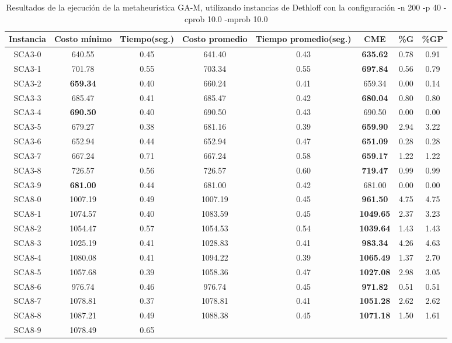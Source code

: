 \begin{table}[ht]
\caption{Resultados de la ejecución de la metaheurística GA-M, utilizando instancias de Dethloff con la configuración -n 200 -p 40 -cprob 10.0 -mprob 10.0}
\centering
\small
\begin{tabular}{c c c c c c c c}
\hline\hline
Instancia & Costo mínimo & Tiempo(seg.) & Costo promedio & Tiempo promedio(seg.) & CME & \%G & \%GP \\ [0.5ex]
\hline
SCA3-0 & 640.55 & 0.45 & 
641.40 & 0.43 & \bf{635.62} & 
0.78 & 0.91\\SCA3-1 & 701.78 & 0.55 & 
703.34 & 0.55 & \bf{697.84} & 
0.56 & 0.79\\SCA3-2 & \bf{659.34} & 0.40 & 
660.24 & 0.41 & 659.34 & 0.00
 & 0.14\\SCA3-3 & 685.47 & 0.41 & 
685.47 & 0.42 & \bf{680.04} & 
0.80 & 0.80\\SCA3-4 & \bf{690.50} & 0.40 & 
690.50 & 0.43 & 690.50 & 0.00
 & 0.00\\
SCA3-5 & 679.27 & 0.38 & 
681.16 & 0.39 & \bf{659.90} & 
2.94 & 3.22\\SCA3-6 & 652.94 & 0.44 & 
652.94 & 0.47 & \bf{651.09} & 
0.28 & 0.28\\SCA3-7 & 667.24 & 0.71 & 
667.24 & 0.58 & \bf{659.17} & 
1.22 & 1.22\\SCA3-8 & 726.57 & 0.56 & 
726.57 & 0.60 & \bf{719.47} & 
0.99 & 0.99\\SCA3-9 & \bf{681.00} & 0.44 & 
681.00 & 0.42 & 681.00 & 0.00
 & 0.00\\
SCA8-0 & 1007.19 & 0.49 & 
1007.19 & 0.45 & \bf{961.50} & 
4.75 & 4.75\\SCA8-1 & 1074.57 & 0.40 & 
1083.59 & 0.45 & \bf{1049.65} & 
2.37 & 3.23\\SCA8-2 & 1054.47 & 0.57 & 
1054.53 & 0.54 & \bf{1039.64} & 
1.43 & 1.43\\SCA8-3 & 1025.19 & 0.41 & 
1028.83 & 0.41 & \bf{983.34} & 
4.26 & 4.63\\SCA8-4 & 1080.08 & 0.41 & 
1094.22 & 0.39 & \bf{1065.49} & 
1.37 & 2.70\\SCA8-5 & 1057.68 & 0.39 & 
1058.36 & 0.47 & \bf{1027.08} & 
2.98 & 3.05\\SCA8-6 & 976.74 & 0.46 & 
976.74 & 0.45 & \bf{971.82} & 
0.51 & 0.51\\SCA8-7 & 1078.81 & 0.37 & 
1078.81 & 0.41 & \bf{1051.28} & 
2.62 & 2.62\\SCA8-8 & 1087.21 & 0.49 & 
1088.38 & 0.45 & \bf{1071.18} & 
1.50 & 1.61\\SCA8-9 & 1078.49 & 0.65 & 

\end{tabular}
\end{table}
